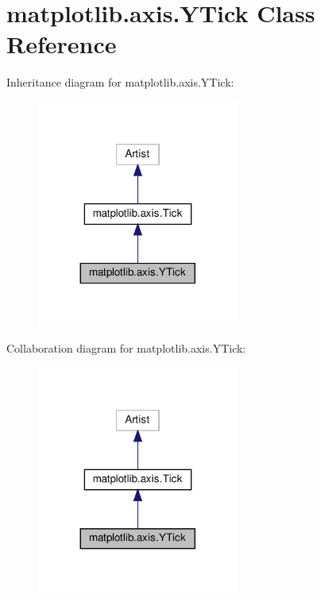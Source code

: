 \hypertarget{classmatplotlib_1_1axis_1_1YTick}{}\section{matplotlib.\+axis.\+Y\+Tick Class Reference}
\label{classmatplotlib_1_1axis_1_1YTick}


Inheritance diagram for matplotlib.\+axis.\+Y\+Tick\+:
\nopagebreak
\begin{figure}[H]
\begin{center}
\leavevmode
\includegraphics[width=188pt]{classmatplotlib_1_1axis_1_1YTick__inherit__graph}
\end{center}
\end{figure}


Collaboration diagram for matplotlib.\+axis.\+Y\+Tick\+:
\nopagebreak
\begin{figure}[H]
\begin{center}
\leavevmode
\includegraphics[width=188pt]{classmatplotlib_1_1axis_1_1YTick__coll__graph}
\end{center}
\end{figure}

